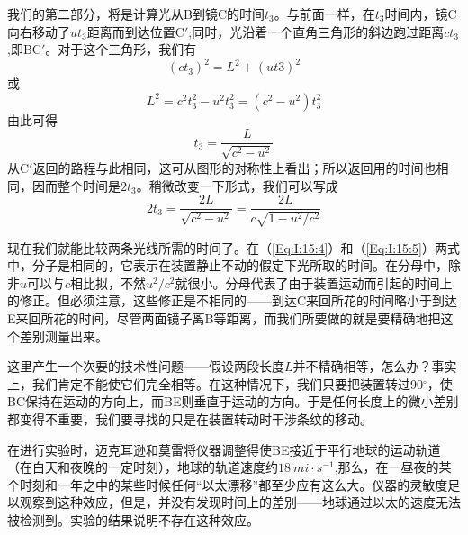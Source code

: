 我们的第二部分，将是计算光从B到镜C的时间$t_3$。与前面一样，在$t_3$时间内，镜C向右移动了$ut_3$距离而到达位置C$'$;同时，光沿着一个直角三角形的斜边跑过距离$ct_3$,即BC$'$。对于这个三角形，我们有
\begin{equation*}
    (ct_3)^2=L^2+(ut3)^2
\end{equation*}
或
\begin{equation*}
    L^2=c^2t^2_3-u^2t^2_3=(c^2-u^2)t^2_3
\end{equation*}
由此可得
\begin{equation*}
    t_3=\frac{L}{\sqrt{c^2-u^2}}
\end{equation*}
从C$'$返回的路程与此相同，这可从图形的对称性上看出；所以返回用的时间也相同，因而整个时间是$2t_3$。稍微改变一下形式，我们可以写成
\begin{equation}
    \label{Eq:I:15:5}
    2t_3=\frac{2L}{\sqrt{c^2-u^2}}=\frac{2L}{c\sqrt{1-u^2/c^2}}
\end{equation}

现在我们就能比较两条光线所需的时间了。在（\ref{Eq:I:15:4}）和（\ref{Eq:I:15:5}）两式中，分子是相同的，它表示在装置静止不动的假定下光所取的时间。在分母中，除非$u$可以与$c$相比拟，不然$u^2/c^2$就很小。分母代表了由于装置运动而引起的时间上的修正。但必须注意，这些修正是不相同的——到达C来回所花的时间略小于到达E来回所花的时间，尽管两面镜子离B等距离，而我们所要做的就是要精确地把这个差别测量出来。

这里产生一个次要的技术性问题——假设两段长度$L$并不精确相等，怎么办？事实上，我们肯定不能使它们完全相等。在这种情况下，我们只要把装置转过90$^\circ$，使BC保持在运动的方向上，而BE则垂直于运动的方向。于是任何长度上的微小差别都变得不重要，我们要寻找的只是在装置转动时干涉条纹的移动。

在进行实验时，迈克耳逊和莫雷将仪器调整得使BE接近于平行地球的运动轨道（在白天和夜晚的一定时刻），地球的轨道速度约$18~mi \cdot s^{-1}$,那么，在一昼夜的某个时刻和一年之中的某些时候任何“以太漂移”都至少应有这么大。仪器的灵敏度足以观察到这种效应，但是，并没有发现时间上的差别——地球通过以太的速度无法被检测到。实验的结果说明不存在这种效应。

